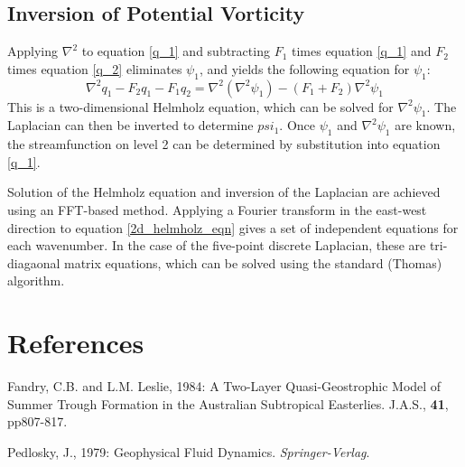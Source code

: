 \documentclass[12pt]{article}
\begin{document}
\subsection{Inversion of Potential Vorticity}
Applying $\nabla^2$ to equation \ref{q_1} and subtracting $F_1$ times
equation \ref{q_1} and $F_2$ times equation \ref{q_2} eliminates
$\psi_1$, and yields the following equation for $\psi_1$:
\begin{equation}
\nabla^2 q_1 -F_2 q_1 -F_1 q_2 = \nabla^2 \left( \nabla^2 \psi_1 \right)
                               - \left( F_1 + F_2 \right) \nabla^2 \psi_1
\label{2d_helmholz_eqn}
\end{equation}
This is a two-dimensional Helmholz equation, which can be solved 
for $\nabla^2 \psi_1$. The Laplacian can then be inverted to
determine $psi_1$. Once $\psi_1$ and $\nabla^2 \psi_1$ are known, the
streamfunction on level 2 can be determined by substitution into
equation \ref{q_1}.

Solution of the Helmholz equation and inversion of the Laplacian are achieved
using an FFT-based method. Applying a Fourier transform in the east-west
direction to equation \ref{2d_helmholz_eqn} gives a set of independent
equations for each wavenumber. In the case of the five-point discrete
Laplacian, these are tri-diagaonal matrix equations, which can be solved
using the standard (Thomas) algorithm.

\section{References}
Fandry, C.B. and L.M. Leslie, 1984: A Two-Layer Quasi-Geostrophic Model of
Summer Trough Formation in the Australian Subtropical Easterlies.
J.A.S., {\bf 41}, pp807-817.

Pedlosky, J., 1979: Geophysical Fluid Dynamics. {\it Springer-Verlag}.
\end{document}
